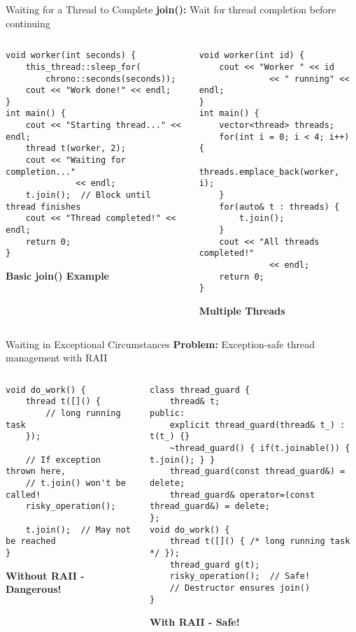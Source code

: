 \begin{frame}[fragile]{Waiting for a Thread to Complete}
	\textbf{join():} Wait for thread completion before continuing

	\begin{columns}
		\begin{column}{0.5\textwidth}
			\begin{verbatim}
void worker(int seconds) {
    this_thread::sleep_for(
        chrono::seconds(seconds));
    cout << "Work done!" << endl;
}
int main() {
    cout << "Starting thread..." << endl;
    thread t(worker, 2);
    cout << "Waiting for completion..."
              << endl;
    t.join();  // Block until thread finishes
    cout << "Thread completed!" << endl;
    return 0;
}
			\end{verbatim}
			\textbf{Basic join() Example}
		\end{column}
		\begin{column}{0.5\textwidth}
			\begin{verbatim}
void worker(int id) {
    cout << "Worker " << id
              << " running" << endl;
}
int main() {
    vector<thread> threads;
    for(int i = 0; i < 4; i++) {
        threads.emplace_back(worker, i);
    }
    for(auto& t : threads) {
        t.join();
    }
    cout << "All threads completed!"
              << endl;
    return 0;
}
			\end{verbatim}
			\textbf{Multiple Threads}
		\end{column}
	\end{columns}
\end{frame}

\begin{frame}[fragile]{Waiting in Exceptional Circumstances}
	\textbf{Problem:} Exception-safe thread management with RAII

	\begin{columns}
		\begin{column}{0.4\textwidth}
			\begin{verbatim}
void do_work() {
    thread t([]() {
        // long running task
    });

    // If exception thrown here,
    // t.join() won't be called!
    risky_operation();

    t.join();  // May not be reached
}
			\end{verbatim}
			\textbf{Without RAII - Dangerous!}
		\end{column}
		\begin{column}{0.6\textwidth}
			\begin{verbatim}
class thread_guard {
    thread& t;
public:
    explicit thread_guard(thread& t_) : t(t_) {}
    ~thread_guard() { if(t.joinable()) { t.join(); } }
    thread_guard(const thread_guard&) = delete;
    thread_guard& operator=(const thread_guard&) = delete;
};
void do_work() {
    thread t([]() { /* long running task */ });
    thread_guard g(t);
    risky_operation();  // Safe!
    // Destructor ensures join()
}
			\end{verbatim}
			\textbf{With RAII - Safe!}
		\end{column}
	\end{columns}
\end{frame}


